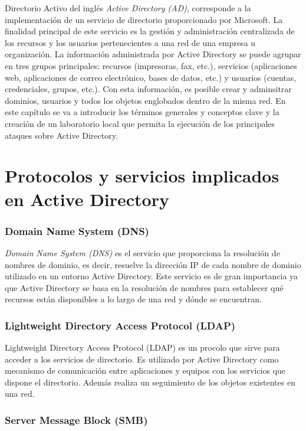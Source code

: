 Directorio Activo del inglés {\it Active Directory (AD)}, corresponde a la implementación de un servicio de directorio proporcionado por Microsoft. La finalidad principal de este servicio es la gestión y administración centralizada de los recursos y los usuarios pertenecientes a una red de una empresa u organización. La in\-for\-ma\-ción administrada por Active Directory se puede agrupar en tres grupos principales: recursos (impresoras, fax, etc.), servicios (aplicaciones web, aplicaciones de correo electrónico, bases de datos, etc.) y usuarios (cuentas, credenciales, grupos, etc.). Con esta in\-for\-ma\-ción, es posible crear y adminsitrar dominios, usuarios y todos los objetos englobados dentro de la misma red. En este capítulo se va a introducir los términos generales y conceptos clave y la creación de un laboratorio local que permita la ejecución de los principales ataques sobre Active Directory.


\section{Protocolos y servicios implicados en Active Directory}

\subsubsection{Domain Name System (DNS)}

{\it Domain Name System (DNS)} es el servicio que proporciona la resolución de nombres de dominio, es decir, resuelve la dirección IP de cada nombre de dominio utilizado en un entorno Active Directory. Este servicio es de gran importancia ya que Active Directory se basa en la resolución de nombres para establecer qué recursos están disponibles a lo largo de una red y dónde se encuentran. 

\subsubsection{Lightweight Directory Access Protocol (LDAP)}

{Lightweight Directory Access Protocol (LDAP)} es un procolo que sirve para acceder a los servicios de directorio. Es utilizado por Active Directory como mecanismo de comunicación entre aplicaciones y equipos con los servicios que dispone el directorio. Además realiza un seguimiento de los objetos existentes en una red. 


\subsubsection{Server Message Block (SMB)}

